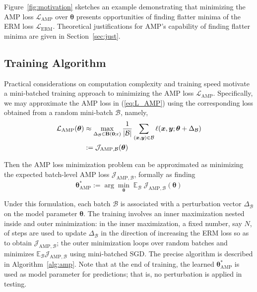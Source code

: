 \documentclass[final]{cvpr}
\begin{document}
Figure~\ref{fig:motivation} sketches an example demonstrating that minimizing the AMP loss $\mathcal{L}_\mathrm{AMP}$ over $\boldsymbol{\theta}$ presents opportunities of finding flatter minima of the ERM loss $\mathcal{L}_\mathrm{ERM}$. Theoretical justifications for AMP's capability of finding flatter minima are given in Section~\ref{sec:just}.

\subsection{Training Algorithm}

Practical considerations on computation complexity and training speed motivate a mini-batched training approach to minimizing the AMP loss $\mathcal{L}_\mathrm{AMP}$. Specifically, we may approximate the AMP loss in (\ref{eq:L_AMP}) using the corresponding loss obtained from a random mini-batch ${\mathcal B}$, namely,
\begin{align}
\mathcal{L}_\mathrm{AMP}(\boldsymbol{\theta})
&\approx\max_{\Delta_{\mathcal{B}}\in{\rm\bf B}(\boldsymbol{0};\epsilon)}\frac{1}{|\mathcal{B}|}\sum_{(\boldsymbol{x},\boldsymbol{y})\in\mathcal{B}}\ell(\boldsymbol{x},\boldsymbol{y};\boldsymbol{\theta}+\Delta_\mathcal{B})\nonumber\\
&:=\mathcal{J}_{\mathrm{AMP},\mathcal{B}}(\boldsymbol{\theta})
\end{align}

Then the AMP loss minimization problem can be approximated as minimizing the expected batch-level AMP loss $\mathcal{J}_{\mathrm{AMP},\mathcal{B}}$, formally as finding
\begin{equation}
\boldsymbol{\theta}^\ast_\mathrm{AMP}:=\arg\min_{\boldsymbol{\theta}}\mathop{\mathbb{E}}_\mathcal{B}\mathcal{J}_{\mathrm{AMP},\mathcal{B}}(\boldsymbol{\theta})
\end{equation}

Under this formulation, each batch $\mathcal{B}$ is associated with a perturbation vector $\Delta_\mathcal{B}$ on the model parameter $\boldsymbol{\theta}$. The training involves an inner maximization nested inside and outer minimization: in the inner maximization, a fixed number, say $N$, of steps are used to update $\Delta_\mathcal{B}$ in the direction of increasing the ERM loss  so as to obtain $\mathcal{J}_{\mathrm{AMP},\mathcal{B}}$; the outer minimization loops over random batches and minimizes $\mathbb{E}_\mathcal{B}\mathcal{J}_{\mathrm{AMP},\mathcal{B}}$ using mini-batched SGD. The precise algorithm is described in Algorithm~\ref{alg:amp}. Note that at the end of training, the learned $\boldsymbol{\theta}^\ast_\mathrm{AMP}$ is used as model parameter for predictions; that is, no perturbation is applied in testing.
\end{document}
